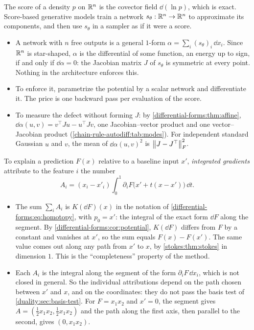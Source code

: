 \begin{notechapter}
\begin{mlthread}
The score of a density $p$ on $\mathbb{R}^n$ is the covector field
$\dd(\ln p)$, which is exact. Score-based generative models train a
network $s_\theta:\mathbb{R}^n\to\mathbb{R}^n$ to approximate its components, and then
use $s_\theta$ in a sampler as if it were a score.
\begin{itemize}[nosep]
  \item A network with $n$ free outputs is a general $1$-form
        $\alpha = \sum_i(s_\theta)_i\,\dd x_i$. Since $\mathbb{R}^n$ is
        star-shaped, $\alpha$ is the differential of some function, an
        energy up to sign, if and only if $\dd\alpha = 0$: the Jacobian
        matrix $J$ of $s_\theta$ is symmetric at every point. Nothing in
        the architecture enforces this.
  \item To enforce it, parametrize the potential by a scalar network
        and differentiate it. The price is one backward pass per
        evaluation of the score.
  \item To measure the defect without forming $J$: by
        \cref{differential-forms:thm:affine},
        $\dd\alpha(u, v) = v^\top Ju - u^\top Jv$, one Jacobian--vector
        product and one vector--Jacobian product
        (\cref{chain-rule-autodiff:tab:modes}). For independent
        standard Gaussian $u$ and $v$, the mean of
        $\dd\alpha(u, v)^2$ is $\left\|J - J^\top\right\|_F^2$.
\end{itemize}
\end{mlthread}

\begin{mlthread}
To explain a prediction $F(x)$ relative to a baseline input $x'$,
\emph{integrated gradients} attribute to the feature $i$ the number
\[
  A_i = (x_i - x'_i)\int_0^1\partial_iF\bigl(x' + t(x - x')\bigr)\,
  \dd t .
\]
\begin{itemize}[nosep]
  \item The sum $\sum_iA_i$ is $K(\dd F)(x)$ in the notation of
        \eqref{differential-forms:eq:homotopy}, with $p_0 = x'$: the
        integral of the exact form $\dd F$ along the segment. By
        \cref{differential-forms:cor:potential}, $K(\dd F)$ differs
        from $F$ by a constant and vanishes at $x'$, so the sum equals
        $F(x) - F(x')$. The same value comes out along any path from
        $x'$ to $x$, by \cref{stokes:thm:stokes} in dimension $1$.
        This is the ``completeness'' property of the method.
  \item Each $A_i$ is the integral along the segment of the form
        $\partial_iF\,\dd x_i$, which is not closed in general. So the
        individual attributions depend on the path chosen between $x'$
        and $x$, and on the coordinates: they do not pass the basis
        test of \cref{duality:sec:basis-test}. For $F = x_1x_2$ and
        $x' = 0$, the segment gives $A = (\frac12x_1x_2, \frac12x_1x_2)$
        and the path along the first axis, then parallel to the second,
        gives $(0, x_1x_2)$.
\end{itemize}
\end{mlthread}


\end{notechapter}
